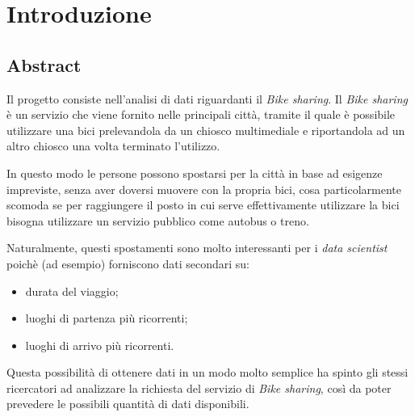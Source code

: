 \section{Introduzione}

\subsection{Abstract}
Il progetto consiste nell'analisi di dati riguardanti il \emph{Bike sharing}.
Il \emph{Bike sharing} è un servizio che viene fornito nelle principali città,
tramite il quale è possibile utilizzare una bici prelevandola da un chiosco
multimediale e riportandola ad un altro chiosco una volta terminato l'utilizzo.

In questo modo le persone possono spostarsi per la città in base ad esigenze
impreviste, senza aver doversi muovere con la propria bici, cosa
particolarmente scomoda se per raggiungere il posto in cui serve
effettivamente utilizzare la bici bisogna utilizzare un servizio pubblico come
autobus o treno.

Naturalmente, questi spostamenti sono molto interessanti per i \emph{data
scientist} poichè (ad esempio) forniscono dati secondari su:

\begin{itemize}
\item durata del viaggio;
\item luoghi di partenza più ricorrenti;
\item luoghi di arrivo più ricorrenti.
\end{itemize}

Questa possibilità di ottenere dati in un modo molto semplice ha spinto gli
stessi ricercatori ad analizzare la richiesta del servizio di \emph{Bike
sharing}, così da poter prevedere le possibili quantità di dati disponibili.

